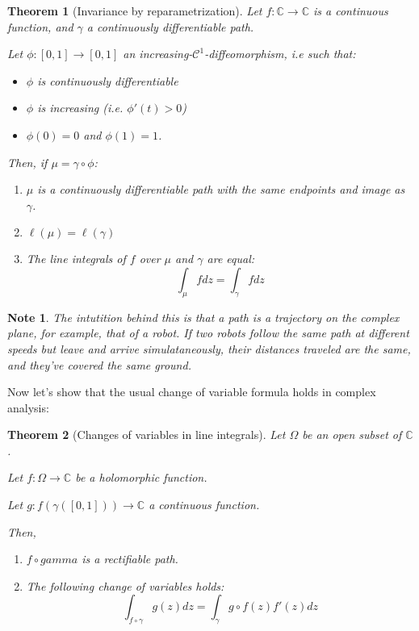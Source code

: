 \documentclass{article}
\newtheorem*{note}{Note}
\newtheorem*{thm*}{Theorem}
\begin{document}
\begin{thm*}[Invariance by reparametrization]
Let $f: \mathbb{C} \rightarrow \mathbb{C}$ is a continuous function, and $\gamma$ a continuously differentiable path.

Let $\phi: [0,1] \rightarrow [0,1]$ an increasing-$\mathcal{C}^1$-diffeomorphism, i.e such that:
\begin{itemize}
    \item $\phi$ is continuously differentiable
    \item $\phi$ is increasing (i.e. $\phi'(t) > 0$)
    \item $\phi(0) = 0$ and $\phi(1)=1$.
\end{itemize}

Then, if $\mu = \gamma \circ \phi$:
\begin{enumerate}
    \item $\mu$ is a continuously differentiable path with the same endpoints and image as $\gamma$.
    \item $\ell(\mu) = \ell(\gamma)$
    \item The line integrals of $f$ over $\mu$ and $\gamma$ are equal:
        $$ \int_\mu fdz = \int_\gamma fdz $$
\end{enumerate}
\end{thm*}

\begin{note}
    The intutition behind this is that a path is a trajectory on the complex plane, for example, that of a robot. If two robots follow the same path at different speeds but leave and arrive simulataneously, their distances traveled are the same, and they've covered the same ground.
\end{note}

Now let's show that the usual change of variable formula holds in complex analysis:

\begin{thm*}[Changes of variables in line integrals]
    Let $\Omega$ be an open subset of $\mathbb{C}$.

    Let $f: \Omega \rightarrow \mathbb{C}$ be a holomorphic function.

    Let $g: f(\gamma([0,1])) \rightarrow \mathbb{C}$ a continuous function.

    Then,
    \begin{enumerate}
        \item $f\circ gamma$ is a rectifiable path.
        \item The following change of variables holds:
            $$\int_{f \circ \gamma}g(z)dz = \int_\gamma g\circ f(z)f'(z)dz$$
    \end{enumerate}

\end{thm*}
\end{document}
